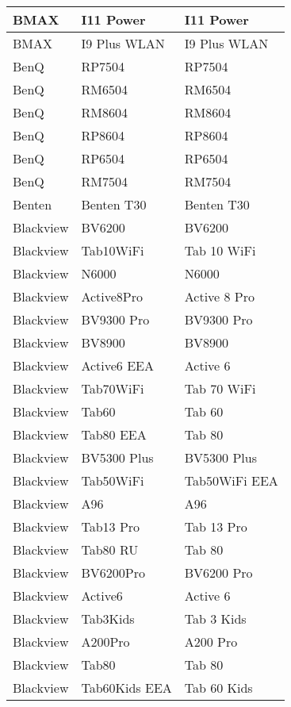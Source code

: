 \begin{tabularx}{\linewidth}{|l|X|X|}
        BMAX & I11 Power & I11 Power \\ \hline
        BMAX & I9 Plus WLAN & I9 Plus WLAN \\ \hline
        BenQ & RP7504 & RP7504 \\ \hline
        BenQ & RM6504 & RM6504 \\ \hline
        BenQ & RM8604 & RM8604 \\ \hline
        BenQ & RP8604 & RP8604 \\ \hline
        BenQ & RP6504 & RP6504 \\ \hline
        BenQ & RM7504 & RM7504 \\ \hline
        Benten & Benten T30 & Benten T30 \\ \hline
        Blackview & BV6200 & BV6200 \\ \hline
        Blackview & Tab10WiFi & Tab 10 WiFi \\ \hline
        Blackview & N6000 & N6000 \\ \hline
        Blackview & Active8Pro & Active 8 Pro \\ \hline
        Blackview & BV9300 Pro & BV9300 Pro \\ \hline
        Blackview & BV8900 & BV8900 \\ \hline
        Blackview & Active6 EEA & Active 6 \\ \hline
        Blackview & Tab70WiFi & Tab 70 WiFi \\ \hline
        Blackview & Tab60 & Tab 60 \\ \hline
        Blackview & Tab80 EEA & Tab 80 \\ \hline
        Blackview & BV5300 Plus & BV5300 Plus \\ \hline
        Blackview & Tab50WiFi & Tab50WiFi EEA \\ \hline
        Blackview & A96 & A96 \\ \hline
        Blackview & Tab13 Pro & Tab 13 Pro \\ \hline
        Blackview & Tab80 RU & Tab 80 \\ \hline
        Blackview & BV6200Pro & BV6200 Pro \\ \hline
        Blackview & Active6 & Active 6 \\ \hline
        Blackview & Tab3Kids & Tab 3 Kids \\ \hline
        Blackview & A200Pro & A200 Pro \\ \hline
        Blackview & Tab80 & Tab 80 \\ \hline
        Blackview & Tab60Kids EEA & Tab 60 Kids \\ \hline

\end{tabularx}
